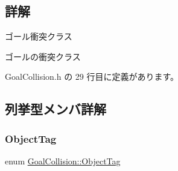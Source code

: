\subsection{詳解}
ゴール衝突クラス 

ゴールの衝突クラス 

 Goal\+Collision.\+h の 29 行目に定義があります。



\subsection{列挙型メンバ詳解}
\mbox{\label{class_goal_collision_a8d0d760973816d9086df90491f38ff62}} 
\subsubsection{\texorpdfstring{Object\+Tag}{ObjectTag}}
{\footnotesize\ttfamily enum \mbox{\hyperlink{class_goal_collision_a8d0d760973816d9086df90491f38ff62}{Goal\+Collision\+::\+Object\+Tag}}}

